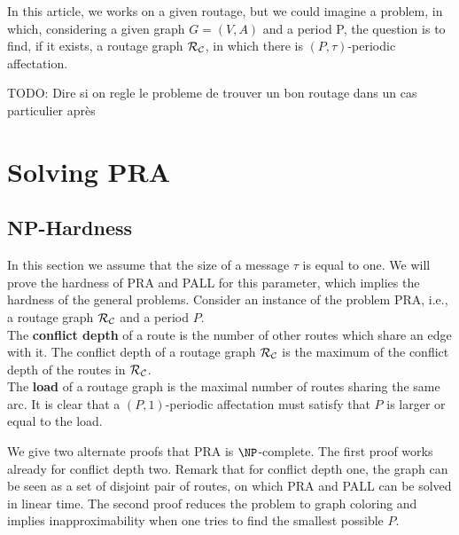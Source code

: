 \documentclass[a4paper,10pt]{article}
\newcommand{\todo}[1]{{\color{red} TODO: {#1}}}
\begin{document}
  In this article, we works on a given routage, but we could imagine a problem, in which, considering a given graph $G = (V,A)$ and a period P, the question is to find, if it exists, a routage graph ${\cal R}_{\cal C}$, in which there is $(P,\tau)$-periodic affectation.
  
  
  \todo{Dire si on regle le probleme de trouver un bon routage dans un cas particulier après}
  
  
\section{Solving PRA}
  \label{sec:complexity}
  \subsection{NP-Hardness}

 In this section we assume that the size of a message $\tau$ is equal to one. 
 We will prove the hardness of PRA and PALL for this parameter, which implies the hardness of the general problems. 
Consider an instance of the problem PRA, i.e., a routage graph $\cal{R_{\cal C}}$ and a period $P$. \\
The {\bf conflict depth} of a route is the number of other routes which share an edge with it. 
The conflict depth of a routage graph  $\cal{R_{\cal C}}$ is the maximum of the conflict depth of the routes in $\cal{R_{\cal C}}$.\\
The {\bf load} of a routage graph is the maximal number of routes sharing the same arc.
It is clear that a $(P,1)$-periodic affectation must satisfy that $P$ is larger or equal to the load.


We give two alternate proofs that PRA is $\NP$-complete.
The first proof works already for conflict depth two. Remark that for conflict depth one,
the graph can be seen as a set of disjoint pair of routes, on which PRA and PALL can be solved in linear time. 
 The second proof reduces the problem to graph coloring and implies inapproximability when one tries to find the smallest possible $P$. \\
\end{document}
